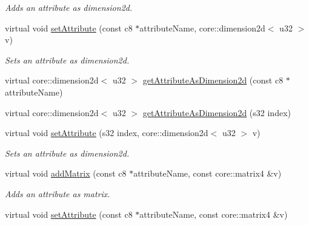 \begin{DoxyCompactItemize}
\begin{DoxyCompactList}\small\item\em Adds an attribute as dimension2d. \end{DoxyCompactList}\item 
virtual void \hyperlink{classirr_1_1io_1_1_c_attributes_a3e94b9eb0dbda755d1c6856b7a0df4e7}{set\-Attribute} (const c8 $\ast$attribute\-Name, core\-::dimension2d$<$ u32 $>$ v)
\begin{DoxyCompactList}\small\item\em Sets an attribute as dimension2d. \end{DoxyCompactList}\item 
virtual core\-::dimension2d$<$ u32 $>$ \hyperlink{classirr_1_1io_1_1_c_attributes_a2229182db5cb17d469b7a22e2f78f83c}{get\-Attribute\-As\-Dimension2d} (const c8 $\ast$attribute\-Name)
\item 
virtual core\-::dimension2d$<$ u32 $>$ \hyperlink{classirr_1_1io_1_1_c_attributes_aed30a4047c4e8999c60114defc8998b3}{get\-Attribute\-As\-Dimension2d} (s32 index)
\item 
virtual void \hyperlink{classirr_1_1io_1_1_c_attributes_abad5d5959148fa68b78d32422b1ac54a}{set\-Attribute} (s32 index, core\-::dimension2d$<$ u32 $>$ v)
\begin{DoxyCompactList}\small\item\em Sets an attribute as dimension2d. \end{DoxyCompactList}\item 
\hypertarget{classirr_1_1io_1_1_c_attributes_aecad32b750654886061975ebfc73b272}{virtual void \hyperlink{classirr_1_1io_1_1_c_attributes_aecad32b750654886061975ebfc73b272}{add\-Matrix} (const c8 $\ast$attribute\-Name, const core\-::matrix4 \&v)}\label{classirr_1_1io_1_1_c_attributes_aecad32b750654886061975ebfc73b272}

\begin{DoxyCompactList}\small\item\em Adds an attribute as matrix. \end{DoxyCompactList}\item 
\hypertarget{classirr_1_1io_1_1_c_attributes_a1d8abcdaebe9292d35c67de6cfb8b213}{virtual void \hyperlink{classirr_1_1io_1_1_c_attributes_a1d8abcdaebe9292d35c67de6cfb8b213}{set\-Attribute} (const c8 $\ast$attribute\-Name, const core\-::matrix4 \&v)}\label{classirr_1_1io_1_1_c_attributes_a1d8abcdaebe9292d35c67de6cfb8b213}


\end{DoxyCompactItemize}
